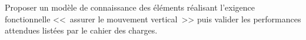 \documentclass[10pt,fleqn]{article} %
\begin{document}
\begin{multicols}{2}
\fi
\begin{obj}
Proposer un modèle de connaissance des éléments réalisant l’exigence fonctionnelle <<~assurer le mouvement vertical~>> puis valider les performances attendues listées par le cahier des charges.
\end{obj}



%
%
%
%
%
%
%
%
%

\end{multicols}
\end{document}
